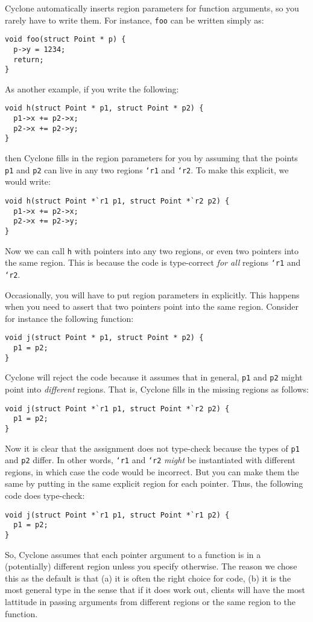 Cyclone automatically inserts region parameters for function
arguments, so you rarely have to write them.  For instance,
\texttt{foo} can be written simply as:
\begin{verbatim}
void foo(struct Point * p) {
  p->y = 1234;
  return;
}
\end{verbatim}
As another example, if you write the following:
\begin{verbatim}
void h(struct Point * p1, struct Point * p2) {
  p1->x += p2->x;
  p2->x += p2->y;
}
\end{verbatim}
then Cyclone fills in the region parameters for you by assuming
that the points \texttt{p1} and \texttt{p2} can live in any
two regions \texttt{`r1} and \texttt{`r2}.  To make this explicit,
we would write:
\begin{verbatim}
void h(struct Point *`r1 p1, struct Point *`r2 p2) {
  p1->x += p2->x;
  p2->x += p2->y;
}
\end{verbatim}
Now we can call \texttt{h} with pointers into any two regions,
or even two pointers into the same region.  This is because
the code is type-correct \emph{for all} regions \texttt{`r1} and \texttt{`r2}.

Occasionally, you will have to put region parameters in explicitly.
This happens when you need to assert that two pointers point into 
the same region.  Consider for instance the following function:
\begin{verbatim}
void j(struct Point * p1, struct Point * p2) {
  p1 = p2;
}
\end{verbatim}
Cyclone will reject the code because it assumes that in general,
\texttt{p1} and \texttt{p2} might point into \emph{different} regions.
That is, Cyclone fills in the missing regions as follows:
\begin{verbatim}
void j(struct Point *`r1 p1, struct Point *`r2 p2) {
  p1 = p2;
}
\end{verbatim}
Now it is clear that the assignment does not type-check because
the types of \texttt{p1} and \texttt{p2} differ.  In other words,
\texttt{`r1} and \texttt{`r2} \emph{might} be instantiated with
different regions, in which case the code would be incorrect.
But you can make them the same by putting in the same explicit region
for each pointer.  Thus, the following code does type-check:
\begin{verbatim}
void j(struct Point *`r1 p1, struct Point *`r1 p2) {
  p1 = p2;
}
\end{verbatim}

So, Cyclone assumes that each pointer argument to a function is
in a (potentially) different region unless you specify otherwise.
The reason we chose this as the default is that (a) it is often
the right choice for code, (b) it is the most general type in
the sense that if it does work out, clients will have the most
lattitude in passing arguments from different regions or the
same region to the function.  

